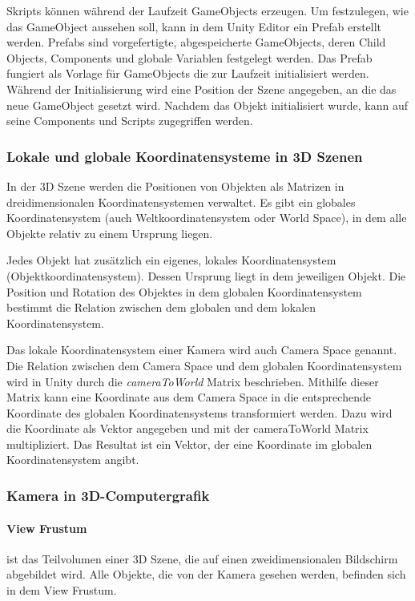 Skripts können während der Laufzeit GameObjects erzeugen. Um festzulegen, wie das GameObject aussehen soll, kann in dem Unity Editor ein Prefab erstellt werden. Prefabs sind vorgefertigte, abgespeicherte GameObjects, deren Child Objects, Components und globale Variablen festgelegt werden. Das Prefab fungiert als Vorlage für GameObjects die zur Laufzeit initialisiert werden. Während der Initialisierung wird eine Position der Szene angegeben, an die das neue GameObject gesetzt wird. Nachdem das Objekt initialisiert wurde, kann auf seine Components und Scripts zugegriffen werden.\citep{unityprefabs}


\subsubsection{Lokale und globale Koordinatensysteme in 3D Szenen}
In der 3D Szene werden die Positionen von Objekten als Matrizen in dreidimensionalen Koordinatensystemen verwaltet. Es gibt ein globales Koordinatensystem (auch Weltkoordinatensystem oder World Space), in dem alle Objekte relativ zu einem Ursprung liegen. 

Jedes Objekt hat zusätzlich ein eigenes, lokales Koordinatensystem (Objektkoordinatensystem). Dessen Ursprung liegt in dem jeweiligen Objekt. Die Position und Rotation des Objektes in dem globalen Koordinatensystem bestimmt die Relation zwischen dem globalen und dem lokalen Koordinatensystem. 

Das lokale Koordinatensystem einer Kamera wird auch Camera Space genannt. Die Relation zwischen dem Camera Space und dem globalen Koordinatensystem wird in Unity durch die \textit{cameraToWorld} Matrix beschrieben. Mithilfe dieser Matrix kann eine Koordinate aus dem Camera Space in die entsprechende Koordinate des globalen Koordinatensystems transformiert werden. Dazu wird die Koordinate als Vektor angegeben und mit der cameraToWorld Matrix multipliziert. Das Resultat ist ein Vektor, der eine Koordinate im globalen Koordinatensystem angibt.\citep{unitycameratoworldmatrix,unitymultiplyoint}

\subsubsection{Kamera in 3D-Computergrafik}
\paragraph{View Frustum}
ist das Teilvolumen einer 3D Szene, die auf einen zweidimensionalen Bildschirm abgebildet wird. Alle Objekte, die von der Kamera gesehen werden, befinden sich in dem View Frustum.

